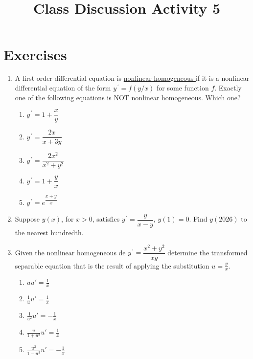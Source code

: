 \documentclass{ximera}
\begin{document}
\begin{abstract}
 \end{abstract}

    \title{Class Discussion Activity 5}
    
    \maketitle

\section*{Exercises}

\begin{enumerate}[label=(\arabic*)]


\item A first order differential equation is \underline{nonlinear homogeneous } if it is a nonlinear differential equation of the form $y^{\,\prime}=f(y/x)$ for some function $f$.  Exactly one of the following equations is NOT nonlinear homogeneous.  Which one?

\begin{enumerate}[label=(\alph*)]
\item $\displaystyle y^{\,\prime}=1+\dfrac{x}{y}$
\item $\displaystyle y^{\,\prime}=\dfrac{2x}{x+3y}$ 
\item $\displaystyle y^{\,\prime}=\dfrac{2x^2}{x^2+y^2}$
\item $\displaystyle y^{\,\prime}=1+\dfrac{y}{x}$ %
\item $\displaystyle y^{\,\prime}=e^{\dfrac{x+y}{x}}$ 
\end{enumerate}

    
\item Suppose $y(x)$, for $x>0$, satisfies $y^{\,\prime}=\dfrac{y}{x-y}$, $y(1)=0$.  Find $y(2026)$ to the nearest hundredth.


\newpage

\item Given the nonlinear homogeneous de $\displaystyle y^{\,\prime}=\dfrac{x^2+y^2}{xy}$ determine the transformed separable equation that is the result of applying the substitution $u=\frac{y}{x}$.\\


 \begin{enumerate}[label=(\alph*)]
\item $\displaystyle u u'=\frac{1}{x}$\\ %
\item $\displaystyle \frac{1}{u} u'=\frac{1}{x}$\\
\item $\displaystyle \frac{1}{u^2} u'=-\frac{1}{x}$\\
\item $\displaystyle \frac{u}{1+u^2} u'=\frac{1}{x}$\\
\item $\displaystyle \frac{u^2}{1-u^3} u'=-\frac{1}{x}$\\
\end{enumerate}


\end{enumerate}
\end{document}
